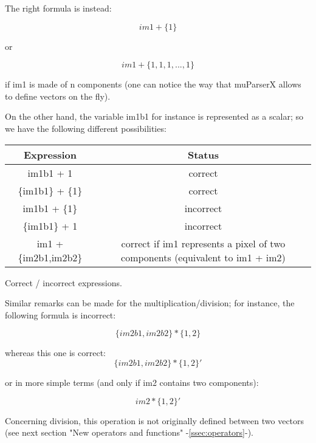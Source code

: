 The right formula is instead:

\begin{equation}
  im1+\{ 1 \}
\end{equation}


or

\begin{equation}
  im1 + \{1,1,1,...,1\}
\end{equation}

if im1 is made of n components (one can notice the way that muParserX allows to define vectors on the fly). 

On the other hand, the variable im1b1 for instance is represented as a scalar; so we have the following different possibilities:

\begin{center} 
\begin{tabular}{||c|c||}
\hline
\bf Expression & \bf Status \\
\hline\hline
im1b1 + 1 & correct \\
\{im1b1\} + \{1\} & correct \\
im1b1 + \{1\} & incorrect \\
\{im1b1\} + 1 & incorrect \\
im1 + \{im2b1,im2b2\} & correct if im1 represents a pixel of two components (equivalent to  im1 + im2) \\
\hline
\end{tabular}
\end{center}
\caption{Correct / incorrect expressions.}
\label{correctness}


Similar remarks can be made for the multiplication/division; for instance, the following formula is incorrect:

\begin{equation}
  \{im2b1,im2b2\} * \{1,2\}
\end{equation}

whereas this one is correct:
\begin{equation}
  \{im2b1,im2b2\} * \{1,2\}'
\end{equation}

or in more simple terms (and only if im2 contains two components): 

\begin{equation}
  im2* \{1,2\}'
\end{equation}

Concerning division, this operation is not originally defined between two vectors (see next section "New operators and functions" -\ref{ssec:operators}-).


